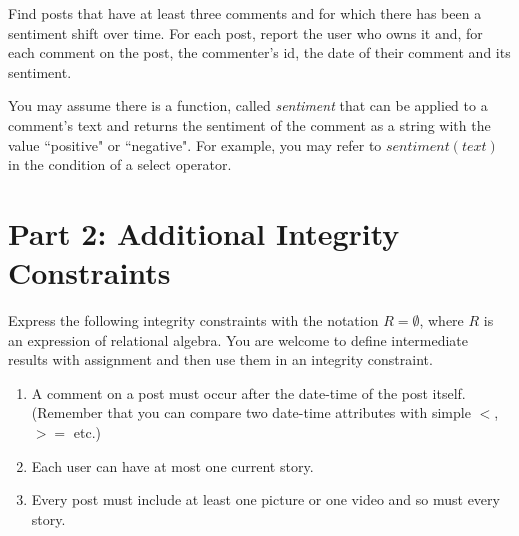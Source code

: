 \documentclass{article}
\begin{document}
\begin{enumerate}
Find posts that have at least three comments and for which there has been a sentiment shift over time. 
For each post, report the user who owns it and,
for each comment on the post,
the commenter's id, 
the date of their comment and its sentiment.

You may assume there is a function, called {\it sentiment}
that can be applied to a comment's text and 
returns the sentiment of the comment as a string with the value ``positive" or ``negative".
For example,
you may refer to $sentiment(text)$ in the condition of a select operator.

\end{enumerate}



\section*{Part 2: Additional Integrity Constraints}


Express the following integrity constraints
with the notation $R = \emptyset$, where $R$ is an expression of relational algebra. 
You are welcome to define intermediate results with assignment
and then use them in an integrity constraint.

\begin{enumerate}

\item   %
A comment on a post must occur after the date-time of the post itself.
(Remember that you can compare two date-time attributes with simple $<$,
$>=$ etc.)

\item %
Each user can have at most one current story.

\item %
Every post must include at least one picture or one video and so must every story.

\end{enumerate}
\end{document}
